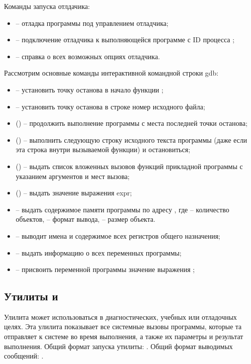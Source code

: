 \noindent Команды запуска отлдачика:
\begin{itemize}
	\item {} -- отладка программы  под управлением отладчика;
	\item {} -- подключение отладчика к выполняющейся программе  с ID процесса ;
	\item {} -- справка о всех возможных опциях отладчика.
\end{itemize}

\noindent Рассмотрим основные команды интерактивной командной строки gdb:
\begin{itemize}
	\item {} -- установить точку останова в начало функции ;
	\item {} -- установить точку останова в строке номер  исходного файла;
	\item {} () -- продолжить выполнение программы с места последней точки останова;
	\item {} () -- выполнить следующую строку исходного текста программы (даже если эта строка внутри вызываемой функции) и остановиться;
	\item {} () -- выдать список вложенных вызовов функций прикладной программы с указанием аргументов и мест вызова;
	\item {} () -- выдать значение выражения expr;
	\item {} -- выдать содержимое памяти программы по адресу , где  -- количество объектов,  -- формат вывода,  -- размер объекта.
	\item {} -- выводит имена и содержимое всех регистров общего назначения;
	\item {} -- выдать информацию о всех переменных программы;
	\item {} -- присвоить переменной  программы значение выражения ;
\end{itemize}

\subsection{Утилиты  и }

Улилита  может использоваться в диагностических, учебных или отладочных целях. Эта улилита показывает все системные вызовы программы, которые та отправляет к системе во время выполнения, а также их параметры и результат выполнения. Общий формат запуска утилиты: . Общий формат выводимых сообщений: .

